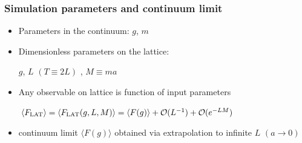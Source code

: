 \documentclass{beamer}
\begin{document}
\begin{frame}
{\begin{tcolorbox}[colback=white!95!black, colframe=white!90!black]
\begin{center}
\vspace{-2mm}
\end{center}
\end{tcolorbox}
%
%
%
\begin{center}
\end{center}
}
\end{frame}


\begin{frame}
\frametitle{Simulation parameters and continuum limit}
\begin{itemize}
\item Parameters in the continuum: $g$, $m$
\item Dimensionless parameters on the lattice:\\
\begin{center}
$g$, $L$ $(T\equiv 2L)$ , $M\equiv ma$
\end{center}
\item Any observable on lattice is function of input parameters\\
\begin{center}
$\langle F_{\rm LAT} \rangle = \langle F_{\rm LAT}(g,L,M) \rangle = \langle F(g) \rangle + \mathcal{O}(L^{-1}) + \mathcal{O}(e^{-LM})$
\end{center}
\item continuum limit $\langle F(g) \rangle$ obtained via extrapolation to infinite $L$ $(a\to 0)$
\end{itemize}
\end{frame}
\end{document}
